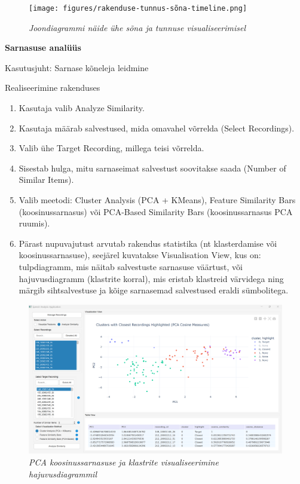 \begin{figure}[H]
    \centering
    \texttt{[image: figures/rakenduse-tunnus-sõna-timeline.png]}
    \caption{\textit{Joondiagrammi näide ühe sõna ja tunnuse visualiseerimisel}}
    \label{fig:rakenduse-tunnus-sõna-timeline.png}
\end{figure}

\textbf{Sarnasuse analüüs
}

Kasutusjuht: Sarnase kõneleja leidmine

Realiseerimine rakenduses
\begin{enumerate}
    \item Kasutaja valib Analyze Similarity.
    \item Kasutaja määrab salvestused, mida omavahel võrrelda (Select Recordings).
    \item Valib ühe Target Recording, millega teisi võrrelda.
    \item Sisestab hulga, mitu sarnaseimat salvestust soovitakse saada (Number of Similar Items).
    \item Valib meetodi: Cluster Analysis (PCA + KMeans), Feature Similarity Bars (koosinussarnasus) või PCA-Based Similarity Bars (koosinussarnasus PCA ruumis).
    \item Pärast nupuvajutust arvutab rakendus statistika (nt klasterdamise või koosinussarnasuse), seejärel kuvatakse Visualisation View, kus on: tulpdiagramm, mis näitab salvestuste sarnasuse väärtust,
    või hajuvusdiagramm (klastrite korral), mis eristab klastreid värvidega ning märgib sihtsalvestuse ja kõige sarnasemad salvestused eraldi sümbolitega.
\end{enumerate}
\begin{figure}[ht]
    \centering
    \includegraphics[width=\textwidth]{figures/rakenduse-sarnasus-cluster-closest.png}
    \caption{\textit{PCA koosinussarnasuse ja klastrite visualiseerimine hajuvusdiagrammil}}
    \label{fig:rakenduse-sarnasus-cluster-closest}
\end{figure}

